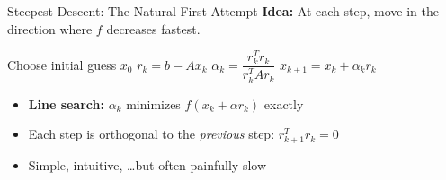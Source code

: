 \documentclass[aspectratio=169]{beamer}
\begin{document}
\begin{frame}{Steepest Descent: The Natural First Attempt}
    \textbf{Idea:} At each step, move in the direction where $f$ decreases fastest.

    \vspace{0.2cm}
    {\footnotesize
    \begin{algorithm}[H]
        \caption{Steepest Descent for $Ax = b$}
        \begin{algorithmic}[1]
            \State Choose initial guess $x_0$
                \State $r_k = b - A x_k$ 
                \State $\alpha_k = \dfrac{r_k^T r_k}{r_k^T A r_k}$
                \State $x_{k+1} = x_k + \alpha_k r_k$
            \EndFor
        \end{algorithmic}
    \end{algorithm}
    }

    \pause
    \vspace{0.15cm}
    \begin{itemize}
        \item \textbf{Line search:} $\alpha_k$ minimizes $f(x_k + \alpha r_k)$ exactly
        \item Each step is orthogonal to the \emph{previous} step: $r_{k+1}^T r_k = 0$
        \item Simple, intuitive, \ldots but often painfully slow
    \end{itemize}
\end{frame}
\end{document}
